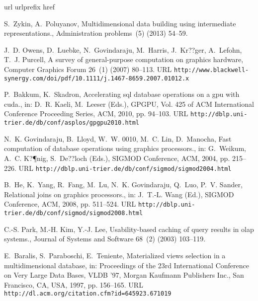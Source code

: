 \documentclass{article}
\begin{document}
\begin{thebibliography}{10}
\expandafter\ifx\csname url\endcsname\relax
  \def\url#1{\texttt{#1}}\fi
\expandafter\ifx\csname urlprefix\endcsname\relax\def\urlprefix{URL }\fi
\expandafter\ifx\csname href\endcsname\relax
  \def\href#1#2{#2} \def\path#1{#1}\fi

S.~Zykin, A.~Poluyanov, Multidimensional data building using intermediate
  representations., Administration problems~(5) (2013) 54--59.

J.~D. Owens, D.~Luebke, N.~Govindaraju, M.~Harris, J.~Kr??ger, A.~Lefohn, T.~J.
  Purcell,
  \href{http://www.blackwell-synergy.com/doi/pdf/10.1111/j.1467-8659.2007.01012.x}{A
  survey of general-purpose computation on graphics hardware}, Computer
  Graphics Forum 26~(1) (2007) 80--113.
\newline\urlprefix\url{http://www.blackwell-synergy.com/doi/pdf/10.1111/j.1467-8659.2007.01012.x}

P.~Bakkum, K.~Skadron,
  \href{http://dblp.uni-trier.de/db/conf/asplos/gpgpu2010.html}{Accelerating
  sql database operations on a gpu with cuda.}, in: D.~R. Kaeli, M.~Leeser
  (Eds.), GPGPU, Vol. 425 of ACM International Conference Proceeding Series,
  ACM, 2010, pp. 94--103.
\newline\urlprefix\url{http://dblp.uni-trier.de/db/conf/asplos/gpgpu2010.html}

N.~K. Govindaraju, B.~Lloyd, W.~W. 0010, M.~C. Lin, D.~Manocha,
  \href{http://dblp.uni-trier.de/db/conf/sigmod/sigmod2004.html}{Fast
  computation of database operations using graphics processors.}, in:
  G.~Weikum, A.~C. K?¶nig, S.~De??loch (Eds.), SIGMOD Conference, ACM, 2004,
  pp. 215--226.
\newline\urlprefix\url{http://dblp.uni-trier.de/db/conf/sigmod/sigmod2004.html}

B.~He, K.~Yang, R.~Fang, M.~Lu, N.~K. Govindaraju, Q.~Luo, P.~V. Sander,
  \href{http://dblp.uni-trier.de/db/conf/sigmod/sigmod2008.html}{Relational
  joins on graphics processors.}, in: J.~T.-L. Wang (Ed.), SIGMOD Conference,
  ACM, 2008, pp. 511--524.
\newline\urlprefix\url{http://dblp.uni-trier.de/db/conf/sigmod/sigmod2008.html}

C.-S. Park, M.-H. Kim, Y.-J. Lee, Usability-based caching of query results in
  olap systems., Journal of Systems and Software 68~(2) (2003) 103--119.

E.~Baralis, S.~Paraboschi, E.~Teniente,
  \href{http://dl.acm.org/citation.cfm?id=645923.671019}{Materialized views
  selection in a multidimensional database}, in: Proceedings of the 23rd
  International Conference on Very Large Data Bases, VLDB '97, Morgan Kaufmann
  Publishers Inc., San Francisco, CA, USA, 1997, pp. 156--165.
\newline\urlprefix\url{http://dl.acm.org/citation.cfm?id=645923.671019}


\end{thebibliography}
\end{document}
